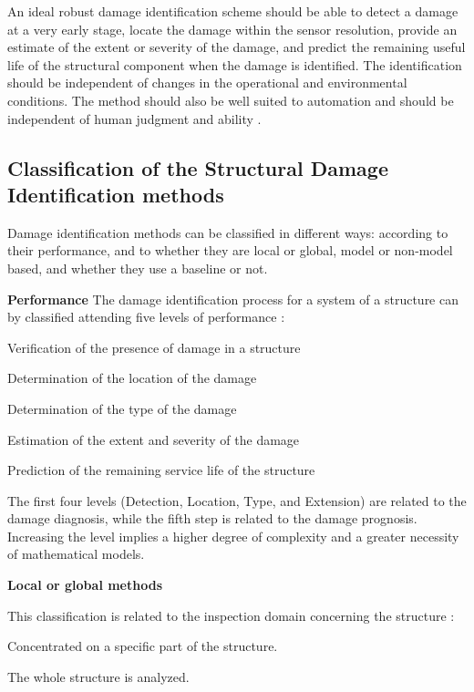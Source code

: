 An ideal robust damage identification scheme should be able to detect a damage at a very early stage, locate the damage within the sensor resolution, provide an estimate of the extent or severity of the damage, and predict the remaining useful life of the structural component when the damage is identified. The identification should be independent of changes in the operational and environmental conditions. The method should also be well suited to automation and should be independent of human judgment and ability \cite{Doebling1996}.

\subsection{Classification of the Structural Damage Identification methods}
Damage identification methods can be classified in different ways: according to their performance, and to whether they are local or global, model or non-model based, and whether they use a baseline or not. 

\textbf{Performance}
The damage identification process for a system of a structure can by classified attending five levels of performance \cite{Rytter1993,Sohn2004, Worden2004, Worden2007}:

\begin{description}[style=sameline]
\item[Level 1: Detection] Verification of the presence of damage in a structure
\item[Level 2: Location] Determination of the location of the damage
\item[Level 3: Type] Determination of the type of the damage
\item[Level 4: Extension] Estimation of the extent and severity of the damage
\item[Level 5: Prognosis] Prediction of the remaining service life of the structure
\end{description}

The first four levels (Detection, Location, Type, and Extension) are related to the damage diagnosis, while the fifth step is related to the damage prognosis. Increasing the level implies a higher degree of complexity and a greater necessity of mathematical models.

\textbf{Local or global methods}

This classification is related to the inspection domain concerning the structure \cite{Fritzen2009}:

\begin{description}[style=sameline]
\item[Local] Concentrated on a specific part of the structure.
\item[Global] The whole structure is analyzed.
\end{description}


